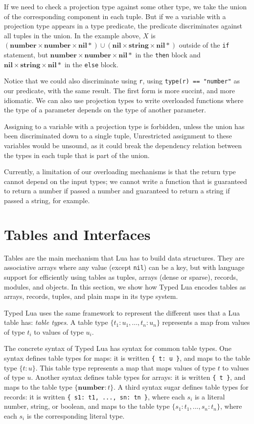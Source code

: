 \documentclass[preprint]{sig-alternate}
\newcommand{\Nil}{\mathbf{nil}}
\newcommand{\Number}{\mathbf{number}}
\newcommand{\String}{\mathbf{string}}
\begin{document}
If we need to check a projection type
against some other type, we take the union of the corresponding
component in each tuple. But if we a variable with a projection
type appears in a type predicate, the predicate discriminates
against all tuples in the union. In the example above,
$X$ is $(\Number \times \Number \times \Nil *) \cup
(\Nil \times \String \times \Nil *)$ outside of the {\tt if}
statement, but $\Number \times \Number \times \Nil *$ in the
{\tt then} block and $\Nil \times \String \times \Nil *$ in
the {\tt else} block.

Notice that we could also discriminate using {\tt r}, using
{\tt type(r) == "number"} as our predicate, with the same
result. The first form is more succint, and more idiomatic.
We can also use projection types to write overloaded functions
where the type of a parameter depends on the type of another
parameter.

Assigning to a variable with a projection type is forbidden,
unless the union has been discriminated down to a single tuple,
Unrestricted assignment to these variables would be unsound,
as it could break the dependency relation between the types
in each tuple that is part of the union.

Currently, a limitation of our overloading mechanisms is that
the return type cannot depend on the input types; we cannot
write a function that is guaranteed to return a number if
passed a number and guaranteed to return a string if passed
a string, for example.

\section{Tables and Interfaces}
\label{sec:tables}

Tables are the main mechanism that Lua has to build data
structures. They are associative arrays where any value
(except {\tt nil}) can be a key, but with language support
for efficiently using tables as tuples, arrays (dense or sparse),
records, modules, and objects. In this section,
we show how Typed Lua encodes tables as arrays, records, tuples,
and plain maps in its type system.

Typed Lua uses the same framework to represent the different
uses that a Lua table has: {\em table types}. A table type
$\{ t_{1}:u_{1}, \ldots, t_{n}:u_{n}\}$ represents a map
from values of type $t_i$ to values of type $u_i$.

The concrete syntax of Typed Lua has syntax for
common table types. One syntax defines table types for
maps: it is written \texttt{\{ t: u \}},
and maps to the table type $\{t:u\}$.
This table type represents a map that maps values of type
$t$ to values of type $u$.
Another syntax defines table types for arrays:
it is written \texttt{\{ t \}}, and maps to the table type
$\{\Number:t\}$. A third syntax sugar defines
table types for records:
it is written \texttt{\{ s1: t1, ..., sn: tn \}}, where
each $s_i$ is a literal number, string, or boolean, 
and maps to the table type $\{s_{1}:t_{1}, ..., s_{n}:t_{n}\}$,
where each $s_i$ is the corresponding literal type.
\end{document}
